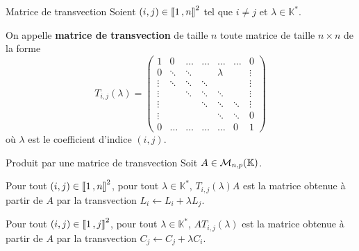     \begin{defi}{Matrice de transvection}{}
        Soient $(i,j) \in \left\llbracket 1 \, , n \right\rrbracket^2$ tel que $i \neq j$ et $\lambda \in \mathbb{K}^*$.
    
        On appelle \textbf{matrice de transvection} de taille $n$ toute matrice de taille $n \times n$ de la forme
        \[ T_{i,j}(\lambda) = \begin{pmatrix}
            1 & 0 & \ldots & \ldots & \ldots & \ldots & 0 \\
            0 & \ddots & \ddots & & \lambda & & \vdots \\
            \vdots & \ddots & \ddots & \ddots & & & \vdots \\
            \vdots & & \ddots & \ddots & \ddots & & \vdots \\
            \vdots & & & \ddots & \ddots & \ddots & \vdots \\
            \vdots & & & & \ddots & \ddots & 0 \\
            0 & \ldots & \ldots & \ldots & \ldots & 0 & 1
        \end{pmatrix} \] où $\lambda$ est le coefficient d’indice $(i,j)$.
    \end{defi}

    \begin{prop}{Produit par une matrice de transvection}{}
        Soit $A \in \mathcal{M}_{n,p}(\mathbb{K})$.

        \begin{alors}
            \item Pour tout $(i,j) \in \left\llbracket 1 \, , n \right\rrbracket^2$, pour tout $\lambda \in \mathbb{K}^*$, $T_{i,j}(\lambda)A$ est la matrice obtenue à partir de $A$ par la transvection $L_i \leftarrow L_i + \lambda L_j$.
            \item Pour tout $(i,j) \in \left\llbracket 1 \, , j \right\rrbracket^2$, pour tout $\lambda \in \mathbb{K}^*$, $AT_{i,j}(\lambda)$ est la matrice obtenue à partir de $A$ par la transvection $C_j \leftarrow C_j + \lambda C_i$.
        \end{alors}
    \end{prop}

